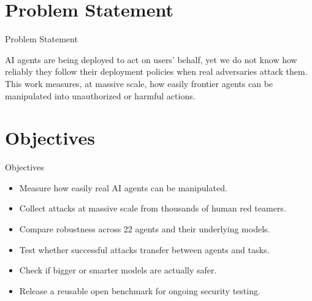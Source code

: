 \documentclass[10pt]{beamer}
\begin{document}
\section{Problem Statement}
\begin{frame}{Problem Statement}
  \begin{block}{}
  AI agents are being deployed to act on users' behalf, yet we do not know how reliably they follow their deployment policies when real adversaries attack them. This work measures, at massive scale, how easily frontier agents can be manipulated into unauthorized or harmful actions.
  \end{block}
\end{frame}
\section{Objectives}
\begin{frame}{Objectives}
\begin{itemize}
  \item Measure how easily real AI agents can be manipulated.
  \item Collect attacks at massive scale from thousands of human red teamers.
  \item Compare robustness across 22 agents and their underlying models.
  \item Test whether successful attacks transfer between agents and tasks.
  \item Check if bigger or smarter models are actually safer.
  \item Release a reusable open benchmark for ongoing security testing.
\end{itemize}
\end{frame}
\end{document}
